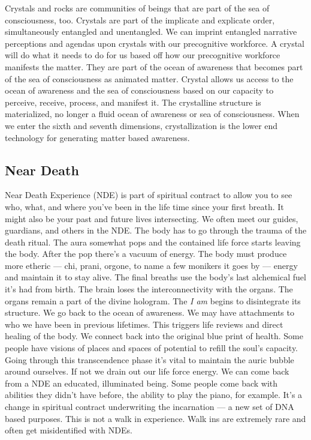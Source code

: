 Crystals and rocks are communities of beings that are part of the sea of
consciousness, too. Crystals are part of the implicate and explicate
order, simultaneously entangled and unentangled. We can imprint
entangled narrative perceptions and agendas upon crystals with our
precognitive workforce. A crystal will do what it needs to do for us
based off how our precognitive workforce manifests the matter. They are
part of the ocean of awareness that becomes part of the sea of
consciousness as animated matter. Crystal allows us access to the ocean
of awareness and the sea of consciousness based on our capacity to
perceive, receive, process, and manifest it. The crystalline structure
is materialized, no longer a fluid ocean of awareness or sea of
consciousness. When we enter the sixth and seventh dimensions,
crystallization is the lower end technology for generating matter based
awareness.

\subsection{Near Death}\label{near-death}

Near Death Experience (NDE) is part of spiritual contract to allow you
to see who, what, and where you've been in the life time since your
first breath. It might also be your past and future lives intersecting.
We often meet our guides, guardians, and others in the NDE. The body has
to go through the trauma of the death ritual. The aura somewhat pops and
the contained life force starts leaving the body. After the pop there's
a vacuum of energy. The body must produce more etheric --- chi, prani,
orgone, to name a few monikers it goes by --- energy and maintain it to
stay alive. The final breaths use the body's last alchemical fuel it's
had from birth. The brain loses the interconnectivity with the organs.
The organs remain a part of the divine hologram. The \emph{I am} begins
to disintegrate its structure. We go back to the ocean of awareness. We
may have attachments to who we have been in previous lifetimes. This
triggers life reviews and direct healing of the body. We connect back
into the original blue print of health. Some people have visions of
places and spaces of potential to refill the soul's capacity. Going
through this transcendence phase it's vital to maintain the auric bubble
around ourselves. If not we drain out our life force energy. We can come
back from a NDE an educated, illuminated being. Some people come back
with abilities they didn't have before, the ability to play the piano,
for example. It's a change in spiritual contract underwriting the
incarnation --- a new set of DNA based purposes. This is not a walk in
experience. Walk ins are extremely rare and often get misidentified with
NDEs.

